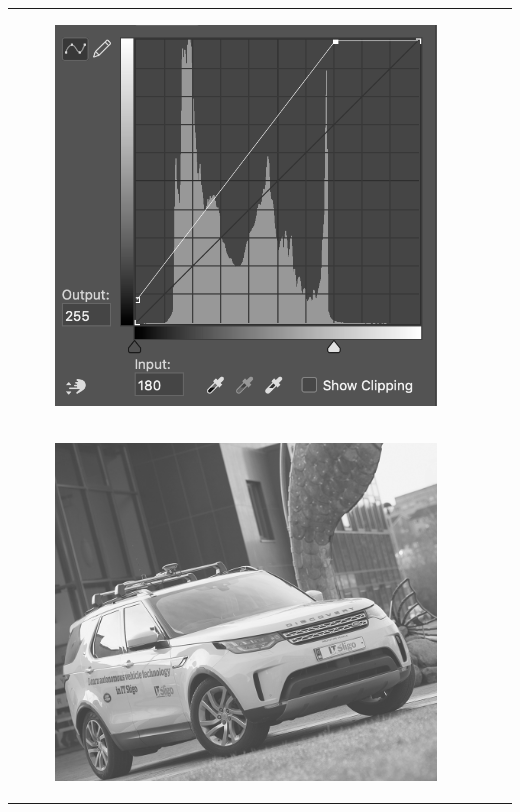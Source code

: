 \begin{frame}
\begin{tabular}{ccc}
\begin{minipage}{0.3\textwidth}
\begin{figure}[H]
	    \includegraphics[width=\textwidth]{images/AffineContrast.png}
	     \end{figure}
        \end{minipage}\\
        \begin{minipage}{0.3\textwidth}
            \begin{figure}[H]

	    \includegraphics[width=\textwidth]{images/CAV15Affine20-180.jpg}
    \end{figure}
        \end{minipage}
        &
        \begin{minipage}{0.3\textwidth}
            

\end{minipage}
\end{tabular}
\end{frame}
